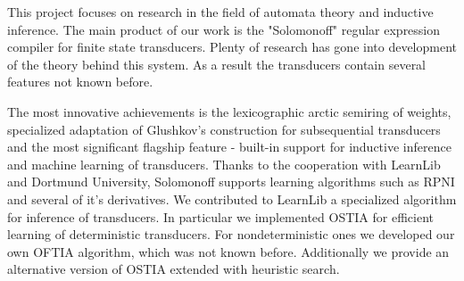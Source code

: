 
This project focuses on research in the field of automata theory and inductive inference.  The main product of our work is the "Solomonoff" regular expression compiler for finite state transducers. Plenty of research has gone into development of the theory behind this system. As a result the transducers contain several features not known before. 

The most innovative achievements is the lexicographic arctic semiring of weights, specialized adaptation of Glushkov's construction for subsequential transducers and the most significant flagship feature - built-in support for inductive inference and machine learning of transducers. Thanks to the cooperation with LearnLib and Dortmund University, Solomonoff supports learning algorithms such as RPNI and several of it's  derivatives. We contributed to LearnLib a specialized algorithm for inference of transducers. In particular we implemented OSTIA for efficient learning of deterministic transducers. For nondeterministic ones we developed our own OFTIA algorithm, which was not known before. Additionally we provide an alternative version of OSTIA extended with heuristic search.

